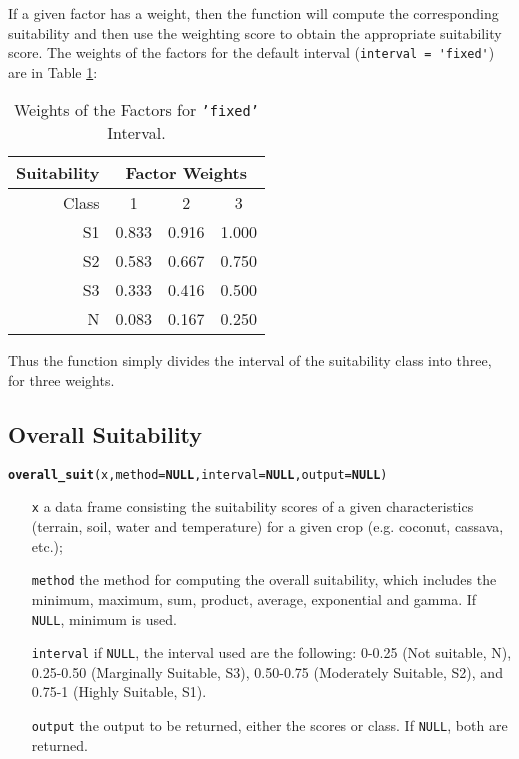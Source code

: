\documentclass[11pt,fleqn]{article}\usepackage[]{graphicx}\usepackage[]{color}
\makeatletter
\newcommand{\hlstd}[1]{\textcolor[rgb]{0.345,0.345,0.345}{#1}}%
\newcommand{\hlkwa}[1]{\textcolor[rgb]{0.161,0.373,0.58}{\textbf{#1}}}%
\newcommand{\hlkwc}[1]{\textcolor[rgb]{0.333,0.667,0.333}{#1}}%
\newcommand{\hlkwd}[1]{\textcolor[rgb]{0.737,0.353,0.396}{\textbf{#1}}}%
\newenvironment{kframe}{%
 \def\at@end@of@kframe{}%
 \ifinner\ifhmode%
  \def\at@end@of@kframe{\end{minipage}}%
  \begin{minipage}{\columnwidth}%
 \fi\fi%
 \def\FrameCommand##1{\hskip\@totalleftmargin \hskip-\fboxsep
 \colorbox{shadecolor}{##1}\hskip-\fboxsep
     \hskip-\linewidth \hskip-\@totalleftmargin \hskip\columnwidth}%
 \MakeFramed {\advance\hsize-\width
   \@totalleftmargin\z@ \linewidth\hsize
   \@setminipage}}%
 {\par\unskip\endMakeFramed%
 \at@end@of@kframe}
\newenvironment{knitrout}{}{} %
\makeatother
\begin{document}
If a given factor has a weight, then the function will compute the corresponding suitability and then use the weighting score to obtain the appropriate suitability score. The weights of the factors for the default interval (\verb|interval = 'fixed'|) are in Table \ref{tab:fixweight}:
\begin{table}[!h]
\begin{tabular}{r|ccc}
\toprule
Suitability&\multicolumn{3}{|c}{Factor Weights}\\
\midrule
Class&1&2&3\\
\midrule
S1&0.833&0.916&1.000\\
S2&0.583&0.667&0.750\\
S3&0.333&0.416&0.500\\
N&0.083&0.167&0.250\\
\bottomrule
\end{tabular}
\caption{Weights of the Factors for \texttt{'fixed'} Interval.}
\label{tab:fixweight}
\end{table}

Thus the function simply divides the interval of the suitability class into three, for three weights.
\subsection{Overall Suitability}
\begin{knitrout}
\color{fgcolor}\begin{kframe}
\begin{alltt}
\hlkwd{overall_suit}\hlstd{(x,} \hlkwc{method} \hlstd{=} \hlkwa{NULL}\hlstd{,} \hlkwc{interval} \hlstd{=} \hlkwa{NULL}\hlstd{,} \hlkwc{output} \hlstd{=} \hlkwa{NULL}\hlstd{)}
\end{alltt}
\end{kframe}
\end{knitrout}
\vspace{-0.5cm}
\begin{itemize}[leftmargin=\dimexpr\linewidth-11.8cm-\rightmargin\relax]
\item[\texttt{x}] a data frame consisting the suitability scores of a given characteristics (terrain, soil, water and temperature) for a given crop (e.g. coconut, cassava, etc.);
\item[\texttt{method}] the method for computing the overall suitability, which includes the minimum, maximum, sum, product, average, exponential and gamma. If \verb|NULL|, minimum is used.
\item[\texttt{interval}] if \verb|NULL|, the interval used are the following: 0-0.25 (Not suitable, N), 0.25-0.50 (Marginally Suitable, S3), 0.50-0.75 (Moderately Suitable, S2), and 0.75-1 (Highly Suitable, S1).
\item[\texttt{output}] the output to be returned, either the scores or class. If \verb|NULL|, both are returned.
\end{itemize}
\end{document}
